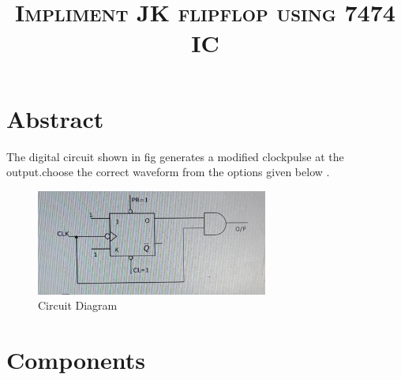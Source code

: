 \documentclass[jornal,10pt,twocolumn]{article}
\title{\textbf{\textsc{Impliment JK flipflop using 7474 IC }}}
\author{\textit{\teflipflopxtbf{Bana Prathyusha}}}
\begin{document}
\section{Abstract}
The digital circuit shown in fig generates a modified clockpulse at the output.choose the correct waveform from the options given below .


\begin{figure}[h]
	\centering
	\includegraphics[width=3in]{dia.jpg}
	\caption{Circuit Diagram}

\end{figure}
\section{Components}
\begin{table}[ht]
\caption{}
\label{Tabel-1}
\end{table}
\end{document}
